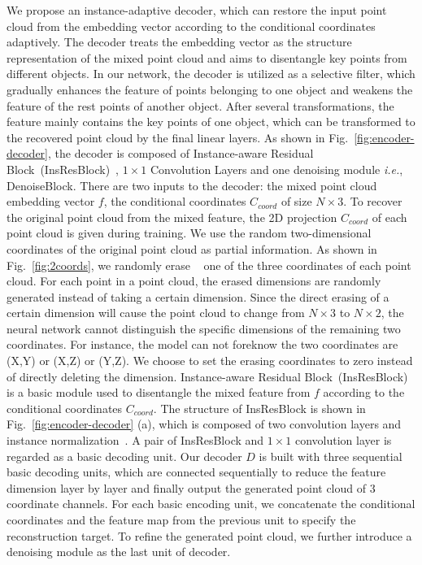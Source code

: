 \documentclass[journal]{IEEEtran}
\def\ie{\emph{i.e.}}
\begin{document}
We propose an instance-adaptive decoder, which can restore the input point cloud from the embedding vector according to the conditional coordinates adaptively. The decoder treats the embedding vector as the structure representation of the mixed point cloud and aims to disentangle key points from different objects. In our network, the decoder is utilized as a selective filter, which gradually enhances the feature of points belonging to one object and weakens the feature of the rest points of another object. After several transformations, the feature mainly contains the key points of one object, which can be transformed to the recovered point cloud by the final linear layers. As shown in Fig.~\ref{fig:encoder-decoder}, the decoder is composed of Instance-aware Residual Block~(InsResBlock)~\cite{huang2017arbitrary}, $1\times1$ Convolution Layers and one denoising module \ie, DenoiseBlock. There are two inputs to the decoder: the mixed point cloud embedding vector $f$, the conditional coordinates $C_{coord}$ of size $N\times3$.
To recover the original point cloud from the mixed feature, the 2D projection $C_{coord}$ of each point cloud is given during training.
We use the random two-dimensional coordinates of the original point cloud as partial information. As shown in Fig.~\ref{fig:2coords}, we randomly erase ~\cite{zhong2020random} one of the three coordinates of each point cloud. For each point in a point cloud, the erased dimensions are randomly generated instead of taking a certain dimension. Since the direct erasing of a certain dimension will cause the point cloud to change from $N\times3$ to $N\times2$, the neural network cannot distinguish the specific dimensions of the remaining two coordinates. For instance, the model can not foreknow the two coordinates are (X,Y) or (X,Z) or (Y,Z).
We choose to set the erasing coordinates to zero instead of directly deleting the dimension. Instance-aware Residual Block~(InsResBlock) is a basic module used to disentangle the mixed feature from $f$ according to the conditional coordinates $C_{coord}$. The structure of InsResBlock is shown in Fig.~\ref{fig:encoder-decoder} (a), which is composed of two convolution layers and instance normalization~\cite{ulyanov2016instance}.
A pair of InsResBlock and $1\times1$ convolution layer is regarded as a basic decoding unit. 
Our decoder $D$ is built with three sequential basic decoding units, which are connected sequentially to reduce the feature dimension layer by layer and finally output the generated point cloud of $3$ coordinate channels. For each basic encoding unit, we concatenate the conditional coordinates and the feature map from the previous unit to specify the reconstruction target. To refine the generated point cloud, we further introduce a denoising module as the last unit of decoder.  
\end{document}
